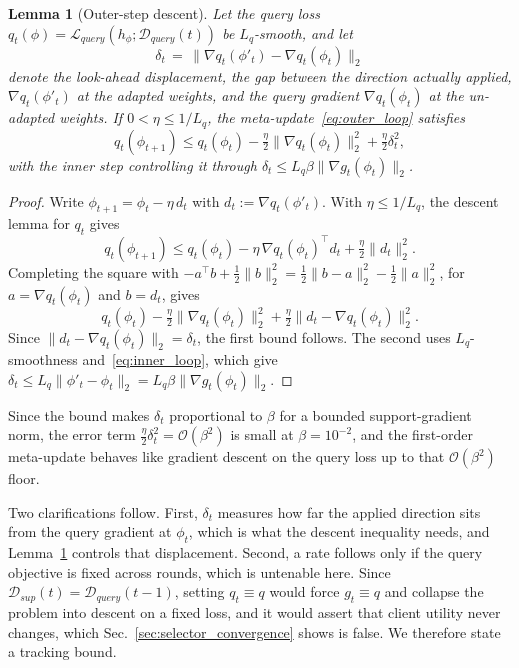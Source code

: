 \documentclass[journal]{IEEEtran}
\newtheorem{Lemma}{Lemma}
\theoremstyle{remark}
\newcommand{\revtwo}[1]{#1}
\begin{document}
{\color{black}
\begin{Lemma}[Outer-step descent]\label{stmt:outer}
Let the query loss $q_t(\phi)=\mathcal{L}_{query}(h_\phi;\mathcal{D}_{query}(t))$ be $L_q$-smooth, and let
\[
\delta_t\,=\,\lVert\nabla q_t(\phi'_t)-\nabla q_t(\phi_t)\rVert_2
\]
denote the \revtwo{\emph{look-ahead displacement}}, the gap between the direction actually applied, $\nabla q_t(\phi'_t)$ at the adapted weights, and the query gradient $\nabla q_t(\phi_t)$ at the un-adapted weights. If $0<\eta\le 1/L_q$, the meta-update~\eqref{eq:outer_loop} satisfies
\[
q_t(\phi_{t+1})\le q_t(\phi_t)-\tfrac{\eta}{2}\lVert\nabla q_t(\phi_t)\rVert_2^2+\tfrac{\eta}{2}\delta_t^2 ,
\]
with the inner step controlling it through $\delta_t\le L_q\beta\lVert\nabla g_t(\phi_t)\rVert_2$.
\end{Lemma}
\begin{proof}
Write $\phi_{t+1}=\phi_t-\eta\,d_t$ with $d_t:=\nabla q_t(\phi'_t)$. With $\eta\le 1/L_q$, the descent lemma for $q_t$ gives
\[
q_t(\phi_{t+1})\le q_t(\phi_t)-\eta\,\nabla q_t(\phi_t)^{\top}d_t+\tfrac{\eta}{2}\lVert d_t\rVert_2^2 .
\]
Completing the square with $-a^{\top}b+\tfrac12\lVert b\rVert_2^2=\tfrac12\lVert b-a\rVert_2^2-\tfrac12\lVert a\rVert_2^2$, for $a=\nabla q_t(\phi_t)$ and $b=d_t$, gives
\[
q_t(\phi_t)-\tfrac{\eta}{2}\lVert\nabla q_t(\phi_t)\rVert_2^2+\tfrac{\eta}{2}\lVert d_t-\nabla q_t(\phi_t)\rVert_2^2 .
\]
Since $\lVert d_t-\nabla q_t(\phi_t)\rVert_2=\delta_t$, the first bound follows. The second uses $L_q$-smoothness and~\eqref{eq:inner_loop}, which give $\delta_t\le L_q\lVert\phi'_t-\phi_t\rVert_2=L_q\beta\lVert\nabla g_t(\phi_t)\rVert_2$.
\end{proof}
Since the bound makes $\delta_t$ proportional to $\beta$ for a bounded support-gradient norm, the error term $\tfrac{\eta}{2}\delta_t^2=\mathcal{O}(\beta^2)$ is \revtwo{small} at $\beta=10^{-2}$, and the first-order meta-update behaves like \revtwo{gradient descent on the query loss up to that $\mathcal{O}(\beta^2)$ floor}.

\revtwo{Two clarifications follow. First, $\delta_t$ measures how far the applied direction sits from the query gradient at $\phi_t$, which is what the descent inequality needs, and Lemma~\ref{stmt:outer} controls that displacement. Second, a rate follows only if the query objective is fixed across rounds, which is untenable here. Since $\mathcal{D}_{sup}(t)=\mathcal{D}_{query}(t-1)$, setting $q_t\equiv q$ would force $g_t\equiv q$ and collapse the problem into descent on a fixed loss, and it would assert that client utility never changes, which Sec.~\ref{sec:selector_convergence} shows is false. We therefore state a tracking bound.}

}
\end{document}
